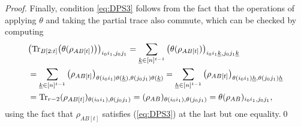 \documentclass[10pt,a4paper]{amsart}
\newcommand{\Tr}{\text{\rm Tr}}
\newcommand{\uh}{\underline{h}}
\newcommand{\uk}{\underline{k}}
\begin{document}
\begin{proof}
       Finally, condition \eqref{eq:DPS3} follows from the fact that the operations of applying $\theta$ and taking the partial trace also commute, which 
       can be checked   by computing
    \begin{align*}
   &     \big(\Tr_{B[2:t]}\big(\theta(\rho_{AB[t]})\big)\big)_{i_0i_1,j_0j_1}
  =\sum_{\uk\in [n]^{t-1}} \big(\theta(\rho_{AB[t]})\big)_{i_0i_1\uk, j_0j_1\uk}\\
  &= \sum_{\uk\in [n]^{t-1}} \big(\rho_{AB[t]}\big)_{\theta(i_0i_1)\theta(\uk),\theta(j_0j_1)\theta(\uk)}
  =\sum_{\uh\in [n]^{t-1}} \big(\rho_{AB[t]}\big)_{\theta(i_0i_1)\uh, \theta(j_0j_1)\uh} \\
    &      =\Tr_{r-2}(\rho_{AB[t]})_{\theta(i_0i_1),\theta(j_0j_1)}=(\rho_{AB})_{\theta(i_0i_1),\theta(j_0j_1)} 
           =\theta(\rho_{AB})_{i_0i_1,j_0j_1}, %
    \end{align*}
using the fact that $\rho_{AB[t]}$ satisfies (\ref{eq:DPS3}) at the last but one equality.\qed \end{proof}
\end{document}

